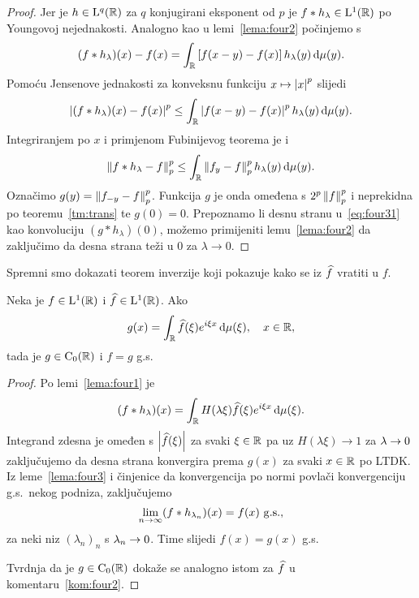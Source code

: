 \documentclass[main.tex]{subfiles}
\begin{document}
\begin{proof}
	Jer je \( h \in \mathrm{L}^q(\mathbb{R}) \) za \( q \) konjugirani eksponent od \( p \) je
	\( f * h_\lambda \in \mathrm{L}^1(\mathbb{R}) \) po Youngovoj nejednakosti. Analogno kao u lemi~\ref{lema:four2}
	počinjemo s
	\begin{equation}
		(f*h_\lambda)(x) - f(x) = \int_{\mathbb{R}} \left[ f(x-y)-f(x) \right] h_\lambda(y) \,\mathrm d \mu (y).
	\end{equation}
	Pomoću Jensenove jednakosti za konveksnu funkciju \( x \mapsto \left| {x} \right| ^p \) slijedi
	\begin{equation}
		\left| {(f*h_\lambda)(x)-f(x)} \right|^p \le \int_{\mathbb{R}} \left| {f(x-y)-f(x)} \right|^p h_\lambda(y) \,\mathrm d\mu(y).
	\end{equation}
	Integriranjem po \( x \) i primjenom Fubinijevog teorema je i
	\begin{equation}\label{eq:four31}
		\left\lVert f*h_\lambda - f\right\rVert_p^p \le \int_{\mathbb{R}} \left\lVert f_y-f\right\rVert_p^p h_\lambda(y) \,\mathrm d\mu(y).
	\end{equation}
	Označimo \( g(y) = \left\lVert f_{-y}-f\right\rVert_p^p \). Funkcija \( g \) je onda
	omeđena s \( 2^p\left\lVert f\right\rVert_p^p \) i neprekidna po teoremu~\ref{tm:trans}
	te \( g(0)=0 \). Prepoznamo li desnu stranu u~\eqref{eq:four31} kao
	konvoluciju \( (g*h_\lambda)(0) \), možemo primijeniti lemu~\ref{lema:four2}
	da zaključimo da desna strana teži u \( 0 \) za \( \lambda \rightarrow 0 \).
\end{proof}

Spremni smo dokazati teorem inverzije koji pokazuje
kako se iz \( \widehat{f} \) vratiti u \( f \).

\begin{teorem}\label{tm:inverzije}
	Neka je \( f \in \mathrm{L}^1(\mathbb{R}) \) i \( \widehat{f} \in \mathrm{L}^1(\mathbb{R}) \). Ako
	\begin{equation}
		g(x) = \int_{\mathbb{R}} \widehat{f}(\xi) e^{i \xi x} \,\mathrm d \mu(\xi), \quad x \in \mathbb{R},
	\end{equation}
	tada je \( g \in \mathrm{C}_0(\mathbb{R}) \) i \( f=g \) g.s.
\end{teorem}

\begin{proof}
	Po lemi~\ref{lema:four1} je
	\begin{equation}
		(f * h_\lambda)(x) = \int_{\mathbb{R}} H(\lambda \xi) \widehat{f} (\xi) e^{i \xi x} \,\mathrm d \mu(\xi).
	\end{equation}
	Integrand zdesna je omeđen s \( \left| {\widehat{f}(\xi)} \right| \) za svaki \( \xi \in \mathbb{R} \)
	pa uz \( H(\lambda \xi) \rightarrow 1 \) za \( \lambda \rightarrow 0 \) zaključujemo da desna
	strana konvergira prema \( g(x) \) za svaki \( x \in \mathbb{R} \) po LTDK. Iz
	leme~\ref{lema:four3} i činjenice da konvergencija po normi
	povlači konvergenciju g.s.\ nekog podniza, zaključujemo
	\begin{equation}
		\lim\limits_{n \rightarrow \infty} (f * h_{\lambda_n})(x) = f(x) \ \mathrm{g.s.},
	\end{equation}
	za neki niz \( (\lambda_n)_n \) s \( \lambda_n \rightarrow 0 \). Time
	slijedi  \( f(x) = g(x) \) g.s.

	Tvrdnja da je \( g \in \mathrm{C}_0(\mathbb{R}) \) dokaže se analogno
	istom za \( \widehat{f} \) u komentaru~\ref{kom:four2}.
\end{proof}
\end{document}
